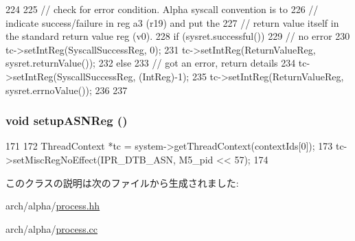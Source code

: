 \begin{DoxyCode}
224 {
225     // check for error condition.  Alpha syscall convention is to
226     // indicate success/failure in reg a3 (r19) and put the
227     // return value itself in the standard return value reg (v0).
228     if (sysret.successful()) {
229         // no error
230         tc->setIntReg(SyscallSuccessReg, 0);
231         tc->setIntReg(ReturnValueReg, sysret.returnValue());
232     } else {
233         // got an error, return details
234         tc->setIntReg(SyscallSuccessReg, (IntReg)-1);
235         tc->setIntReg(ReturnValueReg, sysret.errnoValue());
236     }
237 }
\end{DoxyCode}
\hypertarget{classAlphaLiveProcess_a53a76c20b309afae10d511cf9fa8beb0}{
\subsubsection[{setupASNReg}]{\setlength{\rightskip}{0pt plus 5cm}void setupASNReg ()}}
\label{classAlphaLiveProcess_a53a76c20b309afae10d511cf9fa8beb0}



\begin{DoxyCode}
171 {
172     ThreadContext *tc = system->getThreadContext(contextIds[0]);
173     tc->setMiscRegNoEffect(IPR_DTB_ASN, M5_pid << 57);
174 }
\end{DoxyCode}


このクラスの説明は次のファイルから生成されました:\begin{DoxyCompactItemize}
\item 
arch/alpha/\hyperlink{arch_2alpha_2process_8hh}{process.hh}\item 
arch/alpha/\hyperlink{arch_2alpha_2process_8cc}{process.cc}\end{DoxyCompactItemize}
